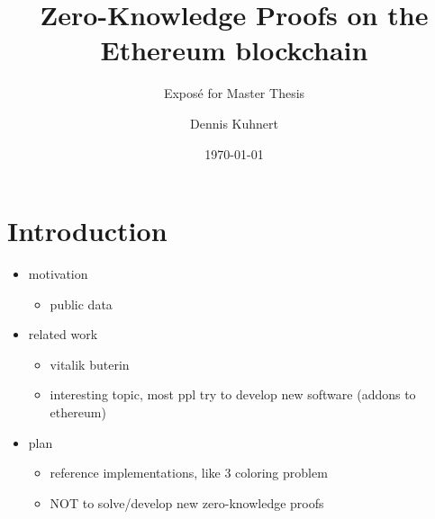 \documentclass[a4paper]{scrartcl}
\title{Zero-Knowledge Proofs on the Ethereum blockchain}
\subtitle{Exposé for Master Thesis}
\author{Dennis Kuhnert}
\date{\today}
\begin{document}
\maketitle

\section{Introduction}

\begin{itemize}
\item motivation
	\begin{itemize}
	\item public data
	\end{itemize}
\item related work
	\begin{itemize}
	\item vitalik buterin \cite{buterin2015public}
	\item interesting topic, most ppl try to develop new software (addons to ethereum)
	\end{itemize}
\item plan
	\begin{itemize}
	\item reference implementations, like 3 coloring problem
	\item NOT to solve/develop new zero-knowledge proofs
	\end{itemize}
\end{itemize}



\end{document}

